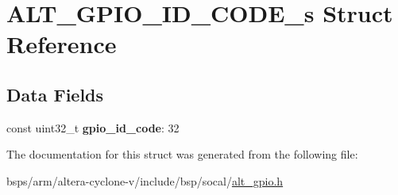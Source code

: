 \hypertarget{structALT__GPIO__ID__CODE__s}{}\section{A\+L\+T\+\_\+\+G\+P\+I\+O\+\_\+\+I\+D\+\_\+\+C\+O\+D\+E\+\_\+s Struct Reference}
\label{structALT__GPIO__ID__CODE__s}
\subsection*{Data Fields}
\begin{DoxyCompactItemize}
\item 
\mbox{\label{structALT__GPIO__ID__CODE__s_a2bf380feac3bc7849f7778aecb54dc6f}} 
const uint32\+\_\+t {\bfseries gpio\+\_\+id\+\_\+code}\+: 32
\end{DoxyCompactItemize}


The documentation for this struct was generated from the following file\+:\begin{DoxyCompactItemize}
\item 
bsps/arm/altera-\/cyclone-\/v/include/bsp/socal/\mbox{\hyperlink{alt__gpio_8h}{alt\+\_\+gpio.\+h}}\end{DoxyCompactItemize}
